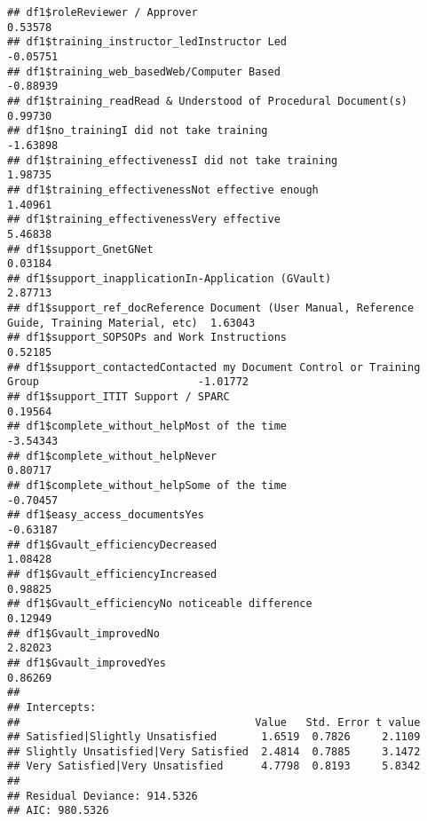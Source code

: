 \documentclass[]{article}
\begin{document}
\begin{verbatim}
## df1$roleReviewer / Approver                                                                   0.53578
## df1$training_instructor_ledInstructor Led                                                    -0.05751
## df1$training_web_basedWeb/Computer Based                                                     -0.88939
## df1$training_readRead & Understood of Procedural Document(s)                                  0.99730
## df1$no_trainingI did not take training                                                       -1.63898
## df1$training_effectivenessI did not take training                                             1.98735
## df1$training_effectivenessNot effective enough                                                1.40961
## df1$training_effectivenessVery effective                                                      5.46838
## df1$support_GnetGNet                                                                          0.03184
## df1$support_inapplicationIn-Application (GVault)                                              2.87713
## df1$support_ref_docReference Document (User Manual, Reference Guide, Training Material, etc)  1.63043
## df1$support_SOPSOPs and Work Instructions                                                     0.52185
## df1$support_contactedContacted my Document Control or Training Group                         -1.01772
## df1$support_ITIT Support / SPARC                                                              0.19564
## df1$complete_without_helpMost of the time                                                    -3.54343
## df1$complete_without_helpNever                                                                0.80717
## df1$complete_without_helpSome of the time                                                    -0.70457
## df1$easy_access_documentsYes                                                                 -0.63187
## df1$Gvault_efficiencyDecreased                                                                1.08428
## df1$Gvault_efficiencyIncreased                                                                0.98825
## df1$Gvault_efficiencyNo noticeable difference                                                 0.12949
## df1$Gvault_improvedNo                                                                         2.82023
## df1$Gvault_improvedYes                                                                        0.86269
## 
## Intercepts:
##                                     Value   Std. Error t value
## Satisfied|Slightly Unsatisfied       1.6519  0.7826     2.1109
## Slightly Unsatisfied|Very Satisfied  2.4814  0.7885     3.1472
## Very Satisfied|Very Unsatisfied      4.7798  0.8193     5.8342
## 
## Residual Deviance: 914.5326 
## AIC: 980.5326
\end{verbatim}
\end{document}
